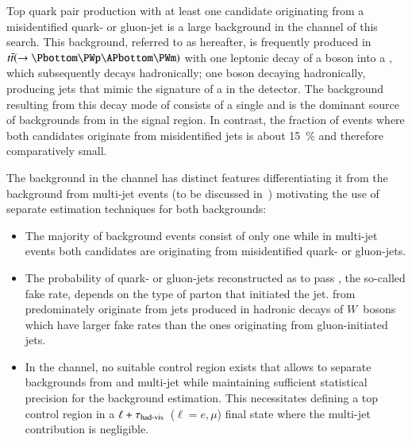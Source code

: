 
Top quark pair production with at least one \tauhadvis candidate
originating from a misidentified quark- or gluon-jet is a large
background in the \hadhad channel of this search. This background,
referred to as \ttbarFakes hereafter, is frequently produced in
$\ttbar(\ra \Pbottom \PWp \APbottom \PWm)$ with one leptonic decay of
a \PW boson into a \taulepton, which subsequently decays hadronically;
one \PW boson decaying hadronically, producing jets that mimic the
signature of a \tauhadvis in the detector. The \faketauhadvis
background resulting from this decay mode of \ttbar consists of a
single \faketauhadvis and is the dominant source of \faketauhadvis
backgrounds from \ttbar in the \hadhad signal region. In contrast, the
fraction of \ttbarFakes events where both \tauhadvis candidates
originate from misidentified jets is about \SI{15}{\percent} and
therefore comparatively small.

The \ttbarFakes background in the \hadhad channel has distinct
features differentiating it from the \faketauhadvis background from
multi-jet events (to be discussed in~)
motivating the use of separate estimation techniques for both
backgrounds:
\begin{itemize}
\item The majority of \ttbarFakes background events consist of only one
  \faketauhadvis while in multi-jet events both \tauhadvis candidates
  are originating from misidentified quark- or gluon-jets.

\item The probability of quark- or gluon-jets reconstructed as
  \tauhadvis to pass \tauid, the so-called fake rate, depends on the
  type of parton that initiated the jet. \Faketauhadvis from \ttbar
  predominately originate from jets produced in hadronic decays of
  $W$~bosons which have larger fake rates than the ones originating
  from gluon-initiated jets.

\item In the \hadhad channel, no suitable \ttbarFakes control region
  exists that allows to separate \faketauhadvis backgrounds from
  \ttbar and multi-jet while maintaining sufficient statistical
  precision for the background estimation. This necessitates defining
  a top control region in a $\ell + \tau_{\text{had-vis}}$~($\ell = e, \mu$)
  final state where the multi-jet contribution is negligible.
\end{itemize}

